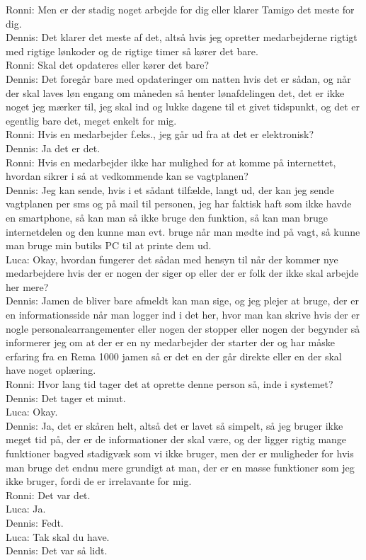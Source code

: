 Ronni: Men er der stadig noget arbejde for dig eller klarer Tamigo det meste for dig.\\
Dennis: Det klarer det meste af det, altså hvis jeg opretter medarbejderne rigtigt med rigtige lønkoder og de rigtige timer så kører det bare.\\
Ronni: Skal det opdateres eller kører det bare?\\
Dennis: Det foregår bare med opdateringer om natten hvis det er sådan, og når der skal laves løn engang om måneden så henter lønafdelingen det, det er ikke noget jeg mærker til, jeg skal ind og lukke dagene til et givet tidspunkt, og det er egentlig bare det, meget enkelt for mig.\\
Ronni: Hvis en medarbejder f.eks., jeg går ud fra at det er elektronisk?\\
Dennis: Ja det er det.\\
Ronni: Hvis en medarbejder ikke har mulighed for at komme på internettet, hvordan sikrer i så at vedkommende kan se vagtplanen?\\
Dennis: Jeg kan sende, hvis i et sådant tilfælde, langt ud, der kan jeg sende vagtplanen per sms og på mail til personen, jeg har faktisk haft som ikke havde en smartphone, så kan man så ikke bruge den funktion, så kan man bruge internetdelen og den kunne man evt. bruge når man mødte ind på vagt, så kunne man bruge min butiks PC til at printe dem ud.\\
Luca: Okay, hvordan fungerer det sådan med hensyn til når der kommer nye medarbejdere hvis der er nogen der siger op eller der er folk der ikke skal arbejde her mere?\\
Dennis: Jamen de bliver bare afmeldt kan man sige, og jeg plejer at bruge, der er en informationsside når man logger ind i det her, hvor man kan skrive hvis der er nogle personalearrangementer eller nogen der stopper eller nogen der begynder så informerer jeg om at der er en ny medarbejder der starter der og har måske erfaring fra en Rema 1000 jamen så er det en der går direkte eller en der skal have noget oplæring.\\
Ronni: Hvor lang tid tager det at oprette denne person så, inde i systemet?\\
Dennis: Det tager et minut.\\
Luca: Okay.\\
Dennis: Ja, det er skåren helt, altså det er lavet så simpelt, så jeg bruger ikke meget tid på, der er de informationer der skal være, og der ligger rigtig mange funktioner bagved stadigvæk som vi ikke bruger, men der er muligheder for hvis man bruge det endnu mere grundigt at man, der er en masse funktioner som jeg ikke bruger, fordi de er irrelavante for mig.\\
Ronni: Det var det.\\
Luca: Ja.\\
Dennis: Fedt.\\
Luca: Tak skal du have.\\
Dennis: Det var så lidt.\\

